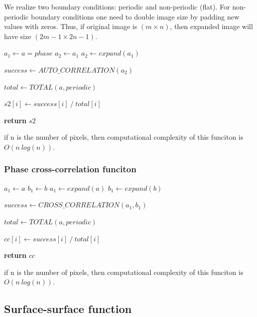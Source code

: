 \documentclass[reprint,amsmath,amssymb,aps,pre,showkeys,showpacs,nofootinbib]{revtex4-1}
\begin{document}
We realize two boundary conditions: periodic and non-periodic (flat).
For non-periodic boundary conditions one need to double image size
by padding new values with zeros.
Thus, if original image is $(m \times n)$,
then expanded image will have size $(2m - 1 \times 2n - 1)$.

\begin{algorithmic}[1]
    \State $a_1 \gets a = phase$
      \State $a_2 \gets a_1$
    \Else
      \State $a_2 \gets expand(a_1)$
    \EndIf
    
    \State $success \gets AUTO\_CORRELATION(a_2)$

    \State $total \gets TOTAL(a, periodic)$

      \State $s2[i] \gets success[i]\ /\ total[i]$
    \EndFor
    
    \State \textbf{return} $s2$
  \EndProcedure
\end{algorithmic} 

if n is the number of pixels, then computational complexity
of this funciton is $O(n\ log(n))$.

\subsubsection{Phase cross-correlation funciton}

\begin{algorithmic}[1]
      \State $a_1 \gets a$
      \State $b_1 \gets b$
    \Else
      \State $a_1 \gets expand(a)$
      \State $b_1 \gets expand(b)$
    \EndIf
    
    \State $success \gets CROSS\_CORRELATION(a_1, b_1)$

    \State $total \gets TOTAL(a, periodic)$

      \State $cc[i] \gets success[i]\ /\ total[i]$
    \EndFor

    \State \textbf{return} $cc$
  \EndProcedure
\end{algorithmic}

if n is the number of pixels, then computational complexity
of this funciton is $O(n\ log(n))$.

\subsection{Surface-surface function}
\end{document}
